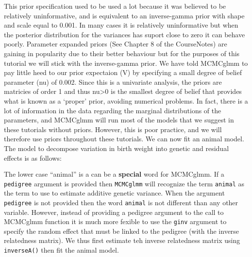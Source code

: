 \documentclass[12pt,]{book}
\newenvironment{Shaded}{\begin{snugshade}}{\end{snugshade}}
\newcommand{\DataTypeTok}[1]{\textcolor[rgb]{0.13,0.29,0.53}{#1}}
\newcommand{\DecValTok}[1]{\textcolor[rgb]{0.00,0.00,0.81}{#1}}
\newcommand{\FloatTok}[1]{\textcolor[rgb]{0.00,0.00,0.81}{#1}}
\newcommand{\KeywordTok}[1]{\textcolor[rgb]{0.13,0.29,0.53}{\textbf{#1}}}
\newcommand{\NormalTok}[1]{#1}
\newcommand{\OperatorTok}[1]{\textcolor[rgb]{0.81,0.36,0.00}{\textbf{#1}}}
\newcommand{\StringTok}[1]{\textcolor[rgb]{0.31,0.60,0.02}{#1}}
\begin{document}
This prior specification used to be used a lot because it was believed to be relatively uninformative, and is equivalent to an inverse-gamma prior with shape and scale equal to 0.001. In many cases it is relatively uninformative but when the posterior distribution for the variances has suport close to zero it can behave poorly. Parameter expanded priors (See Chapter 8 of the CourseNotes) are gaining in popularity due to their better behaviour but for the purposes of this tutorial we will stick with the inverse-gamma prior. We have told MCMCglmm to pay little heed to our prior expectaion (V) by specifying a small degree of belief parameter (nu) of 0.002. Since this is a univariate analysis, the priors are matricies of order 1 and thus nu\textgreater{}0 is the smallest degree of belief that provides what is known as a `proper' prior, avoiding numerical problems. In fact, there is a lot of information in the data regarding the marginal distributions of the parameters, and MCMCglmm will run most of the models that we suggest in these tutorials without priors. However, this is poor practice, and we will therefore use priors throughout these tutorials. We can now fit an animal model. The model to decompose variation in birth weight into genetic and residual effects is as follows:

The lower case ``animal'' is a can be a \textbf{special} word for MCMCglmm. If a \texttt{pedigree} argument is provided then \texttt{MCMCglmm} will recognize the term \texttt{animal} as the term to use to estimate additive genetic variance. When the argument \texttt{pedigree} is not provided then the word \texttt{animal} is not different than any other variable. However, instead of providing a pedigree argument to the call to MCMCglmm function it is much more fexible to use the \texttt{ginv} argument to specify the random effect that must be linked to the pedigree (with the inverse relatedness matrix). We thus first estimate teh inverse relatedness matrix using \texttt{inverseA()} then fit the animal model.

\begin{Shaded}
\end{Shaded}
\end{document}
